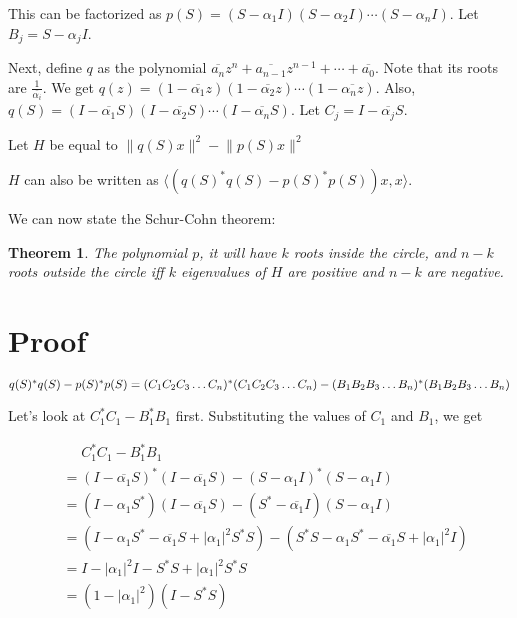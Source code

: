 \documentclass[twofold, twocolumn]{article}
\newcommand*\conj[1]{\overline{#1}}
\newcommand*\abs[1]{\left \vert #1 \right\vert}
\newcommand*\adj[1]{#1^*}
\theoremstyle{plain}
\newtheorem*{theorem}{Theorem}
\theoremstyle{definition}
\begin{document}
This can be factorized as \(p(S) = (S - \alpha_1I) (S - \alpha_2 I) \cdots (S - \alpha_n I)\). Let \(B_j = S - \alpha_jI\).

Next, define \(q\) as the polynomial \(\conj{a_n}z^n + \conj{a_{n-1}}z^{n-1} + \cdots + \conj{a_0}\). Note that its roots are \(\frac {1}{\conj{\alpha_i}}\). We get \(q(z) = (1 - \conj{\alpha_1}z) (1 - \conj{\alpha_2}z) \cdots (1 - \conj{\alpha_nz})\). Also, \(q(S) = (I - \conj{\alpha_1}S) (I - \conj{\alpha_2}S) \cdots (I - \conj{\alpha_n}S)\). Let \(C_j= I -  \conj{\alpha_j} S\).



Let \(H\) be equal to \(\lVert q(S) x \rVert^2 - \lVert p(S) x \rVert^2\)

\(H\) can also be written as \(\langle (\adj{q(S)} q(S) - \adj{p(S)} p(S))x, x\rangle\).

We can now state the Schur-Cohn theorem:

\begin{theorem}The polynomial \(p\), it will have \(k\) roots inside the circle, and \(n-k\) roots outside the circle iff \(k\) eigenvalues of \(H\) are positive and \(n-k\) are negative. \end{theorem}

\section{Proof}

\(\adj{q(S)} q(S) - \adj{p(S)} p(S) \\
= \adj{(C_1C_2C_3 \ldots C_n)}(C_1C_2C_3\ldots C_n) - \adj{(B_1B_2B_3\ldots B_n)} (B_1B_2B_3\ldots B_n)\)

Let's look at \(\adj{C_1} C_1 - \adj{B_1} B_1\) first. Substituting the values of \(C_1\) and \(B_1\), we get 

\begin{equation*}
\begin{split}
& \phantom{=}    \adj{C_1}C_1 - \adj{B_1} B_1 \\
 & = \adj{(I - \conj{\alpha_1}S)} (I - \conj{\alpha_1}S) - \adj{(S - \alpha_1 I)} (S - \alpha_1 I) \\
& = (I - \alpha_1\adj{S}) (I - \conj{\alpha_1}S) - (\adj{S} - \conj{\alpha_1} I) (S - \alpha_1 I) \\
 & = (I - \alpha_1\adj{S} - \conj{\alpha_1}S + \abs{\alpha_1}^2 \adj{S} S) - (\adj{S} S - \alpha_1 \adj{S} - \conj{\alpha_1} S + \abs{\alpha_1}^2I)\\
& = I - \abs{\alpha_1}^2 I - \adj{S} S + \abs{\alpha_1}^2 \adj{S} S \\
& = (1 - \abs{\alpha_1}^2) (I - \adj{S} S)
\end{split}
\end{equation*}
\end{document}
